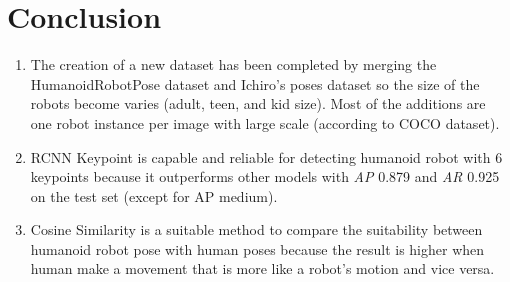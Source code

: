 \section{Conclusion}
\label{sec:conclusion}


\begin{enumerate}

      \item The creation of a new dataset has been completed by merging the HumanoidRobotPose dataset and Ichiro's poses dataset 
            so the size of the robots become varies (adult, teen, and kid size). Most of the additions are one robot instance per image with large scale (according to COCO dataset).
      \item RCNN Keypoint is capable and reliable for detecting humanoid robot with 6 keypoints because it outperforms other models with \emph{AP} 0.879 and \emph{AR} 0.925 on the test set (except for AP medium).
      \item Cosine Similarity is a suitable method to compare the suitability between humanoid robot pose with human poses because the result is higher when
            human make a movement that is more like a robot's motion and vice versa.
\end{enumerate}